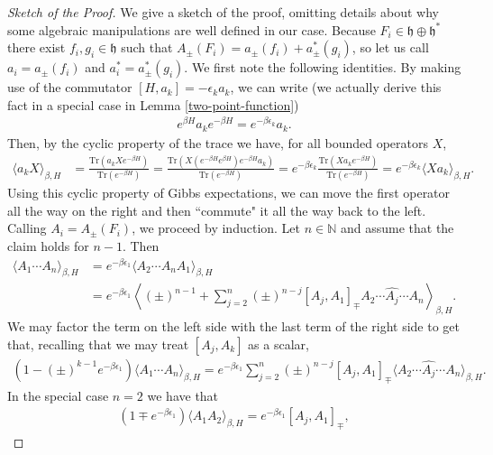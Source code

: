 \begin{proof}[Sketch of the Proof]
	We give a sketch of the proof, omitting details about why some algebraic manipulations are
	well defined in our case. Because $F_i\in\mathfrak{h}\oplus\mathfrak{h}^*$ there exist
	$f_i,g_i\in\mathfrak{h}$ such that $A_\pm(F_i) = a_\pm(f_i) + a^*_\pm(g_i)$, so let us
	call $a_i = a_\pm(f_i)$ and $a^*_i = a^*_\pm(g_i)$. We first note the following identities.
	By making use of the commutator $[H,a_k]=-\epsilon_k a_k$, we can write (we actually
	derive this fact in a special case in Lemma \ref{two-point-function})
	\begin{align*}
		e^{\beta H}a_k e^{-\beta H} = e^{-\beta\epsilon_k}a_k.
	\end{align*}
	Then, by the cyclic property of the trace we have, for all bounded operators $X$,
	\begin{align*}
		\langle a_k X\rangle_{\beta,H}
		&= \frac{\mathrm{Tr}(a_k X e^{-\beta H})}{\mathrm{Tr}(e^{-\beta H})}
		= \frac{\mathrm{Tr}(X (e^{-\beta H}e^{\beta H}) e^{-\beta H} a_k)}{\mathrm{Tr}(e^{-\beta H})}
		= e^{-\beta\epsilon_k}\frac{\mathrm{Tr}(Xa_ke^{-\beta H})}{\mathrm{Tr}(e^{-\beta H})}
		= e^{-\beta\epsilon_k}\langle Xa_k\rangle_{\beta,H}.
	\end{align*}
	Using this cyclic property of Gibbs expectations, we can move the first operator all the
	way on the right and then ``commute" it all the way back to the left.
	Calling $A_i=A_\pm(F_i)$, we proceed by induction. Let $n\in\mathbb{N}$ and assume that
	the claim holds for $n-1$. Then
	\begin{align*}
		\langle A_1\cdots A_n\rangle_{\beta,H}
		&= e^{-\beta\epsilon_1}\langle A_2\cdots A_nA_1\rangle_{\beta,H}\\
		&= e^{-\beta\epsilon_1}\left\langle
		(\pm)^{n-1} + \sum_{j=2}^n (\pm)^{n-j}[A_j,A_1]_\mp A_2\cdots\widehat{A_j}\cdots A_n
		\right\rangle_{\beta,H}.
	\end{align*}
	We may factor the term on the left side with the last term of the right side to get that,
	recalling that we may treat $[A_j,A_k]$ as a scalar,
	\begin{align*}
		(1 - (\pm)^{k-1}e^{-\beta\epsilon_1})\langle A_1\cdots A_n\rangle_{\beta,H}
		= e^{-\beta\epsilon_1}\sum_{j=2}^n(\pm)^{n-j}[A_j,A_1]_\mp\langle A_2\cdots\widehat{A_j}\cdots A_n\rangle_{\beta,H}.
	\end{align*}
	In the special case $n=2$ we have that
	\begin{align*}
		(1 \mp e^{-\beta\epsilon_1})\langle A_1A_2\rangle_{\beta,H} = e^{-\beta\epsilon_1}[A_j,A_1]_\mp,

\end{align*}
\end{proof}
